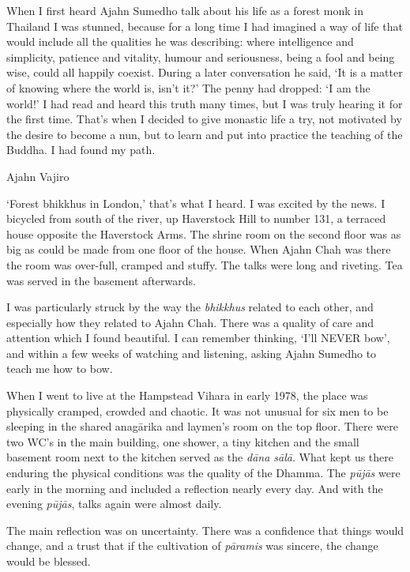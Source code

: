 When I first heard Ajahn Sumedho talk about his life as a forest monk in
Thailand I was stunned, because for a long time I had imagined a way of
life that would include all the qualities he was describing: where
intelligence and simplicity, patience and vitality, humour and
seriousness, being a fool and being wise, could all happily coexist.
During a later conversation he said, `It is a matter of knowing where
the world is, isn't it?' The penny had dropped: `I am the world!' I had
read and heard this truth many times, but I was truly hearing it for the
first time. That's when I decided to give monastic life a try, not
motivated by the desire to become a nun, but to learn and put into
practice the teaching of the Buddha. I had found my path.

Ajahn Vajiro

`Forest bhikkhus in London,' that's what I heard. I was excited by the
news. I bicycled from south of the river, up Haverstock Hill to number
131, a terraced house opposite the Haverstock Arms. The shrine room on
the second floor was as big as could be made from one floor of the
house. When Ajahn Chah was there the room was over-full, cramped and
stuffy. The talks were long and riveting. Tea was served in the basement
afterwards.

I was particularly struck by the way the \emph{bhikkhus} related to each
other, and especially how they related to Ajahn Chah. There was a
quality of care and attention which I found beautiful. I can remember
thinking, `I'll NEVER bow', and within a few weeks of watching and
listening, asking Ajahn Sumedho to teach me how to bow.

When I went to live at the Hampstead Vihara in early 1978, the place was
physically cramped, crowded and chaotic. It was not unusual for six men
to be sleeping in the shared anagārika and laymen's room on the top
floor. There were two WC's in the main building, one shower, a tiny
kitchen and the small basement room next to the kitchen served as the
\emph{dāna sālā}. What kept us there enduring the physical conditions
was the quality of the Dhamma. The \emph{pūjās} were early in the
morning and included a reflection nearly every day. And with the evening
\emph{pūjās}, talks again were almost daily.

The main reflection was on uncertainty. There was a confidence that
things would change, and a trust that if the cultivation of
\emph{pāramis} was sincere, the change would be blessed.

